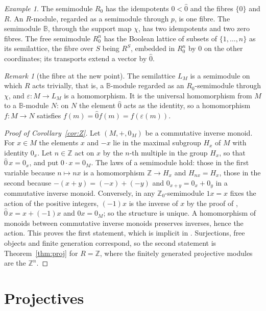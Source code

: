 \documentclass[11pt]{amsart}
\theoremstyle{remark}
\newtheorem{remark}[thm]{Remark}
\newtheorem{example}[thm]{Example}
\newcommand{\B}{\mathbb B}
\newcommand{\oz}{\widehat{0}}
\begin{document}
\begin{example}\label{ex:mod}
The semimodule $R_0$ has the idempotents $0<\oz$ and the fibres $\{0\}$ and $R$. An $R$-module, regarded as a semimodule through $p$, is one fibre. The semimodule $\B$, through the support map $\chi$, has two idempotents and two zero fibres. The free semimodule $R_0^n$ has the Boolean lattice of subsets of $\{1,\dots,n\}$ as its semilattice, the fibre over $S$ being $R^S$, embedded in $R_0^n$ by $0$ on the other coordinates; its transports extend a vector by $\oz$.
\end{example}

\begin{remark}[the fibre at the new point]\label{rem:generic}
The semilattice $L_M$ is a semimodule on which $R$ acts trivially, that is, a $\B$-module regarded as an $R_0$-semimodule through $\chi$, and $\varepsilon\colon M\to L_M$ is a homomorphism. It is the universal homomorphism from $M$ to a $\B$-module $N$: on $N$ the element $\oz$ acts as the identity, so a homomorphism $f\colon M\to N$ satisfies $f(m)=\oz f(m)=f(\varepsilon(m))$.
\end{remark}

\begin{proof}[Proof of Corollary~\ref{cor:Z}]
Let $(M,+,0_M)$ be a commutative inverse monoid. For $x\in M$ the elements $x$ and $-x$ lie in the maximal subgroup $H_x$ of $M$ with identity $0_x$. Let $n\in\mathbb Z$ act on $x$ by the $n$-th multiple in the group $H_x$, so that $\oz\,x=0_x$, and put $0\cdot x=0_M$. The laws of a semimodule hold: those in the first variable because $n\mapsto nx$ is a homomorphism $\mathbb Z\to H_x$ and $H_{nx}=H_x$, those in the second because $-(x+y)=(-x)+(-y)$ and $0_{x+y}=0_x+0_y$ in a commutative inverse monoid. Conversely, in any $\mathbb Z_0$-semimodule $1x=x$ fixes the action of the positive integers, $(-1)x$ is the inverse of $x$ by the proof of \cite[Proposition 6.1]{FGJM}, $\oz\,x=x+(-1)x$ and $0x=0_M$; so the structure is unique. A homomorphism of monoids between commutative inverse monoids preserves inverses, hence the action. This proves the first statement, which is implicit in \cite[Proposition 5.1 and Example 3.3]{FGJM}. Surjections, free objects and finite generation correspond, so the second statement is Theorem~\ref{thm:proj} for $R=\mathbb Z$, where the finitely generated projective modules are the $\mathbb Z^n$.
\end{proof}

\section{Projectives}\label{sec:proj}
\end{document}
